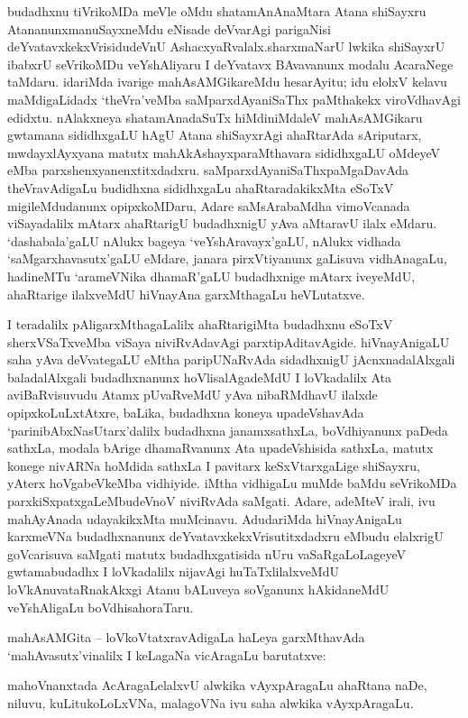 budadhxnu tiVrikoMDa meVle oMdu shatamAnAnaMtara Atana shiSayxru Atananunx\break manuSayxneMdu eNisade deVvarAgi parigaNisi deYvatavxkekxVrisidudeVnU AshacxyaRvalalx.\break sharxmaNarU lwkika shiSayxrU ibabxrU seVrikoMDu veYshAliyaru I deYvatavx BAva\-vanunx modalu AcaraNege taMdaru. idariMda ivarige mahAsAMGikareMdu hesarAyitu; idu elolxV kelavu maMdigaLidadx `theVra'veMba saMparxdAyaniSaThx paMthakekx viroVdha\-vAgi edidxtu. nAlakxneya shatamAnadaSuTx hiMdiniMdaleV mahAsAMGikaru gwtamana sididhx\-gaLU hAgU Atana shiSayxrAgi ahaRtarAda sAriputarx, mwdayxlAyxyana matutx mahA\-kAshayxparaMthavara sididhxgaLU oMdeyeV eMba parxshenxyanenxtitxdadxru. saMparxdAyaniSaThx\break paMgaDavAda theVravAdigaLu budidhxna sididhxgaLu ahaRtaradakikxMta eSoTxV migileMdu\-danunx opipxkoMDaru, Adare saMsArabaMdha vimoVcanada viSayadalilx mAtarx ahaRtarigU budadhxnigU yAva aMtaravU ilalx eMdaru. `dashabala'gaLU nAlukx bageya `veYshAravayx'gaLU, nAlukx vidhada `saMgarxhavasutx'gaLU eMdare, janara pirxVtiyanunx gaLisuva vidhAnagaLu, hadineMTu `arameVNika dhamaR'gaLU budadhxnige mAtarx iveyeMdU, ahaRtarige ilalxveMdU hiVnayAna garxMthagaLu heVLutatxve.

I teradalilx pAligarxMthagaLalilx ahaRtarigiMta budadhxnu eSoTxV sherxVSaTxveMba viSaya niviRvAdavAgi parxtipAditavAgide. hiVnayAnigaLU saha yAva deVvategaLU eMtha paripUNaRvAda sidadhxnigU  jAcnxnadalAlxgali baladalAlxgali budadhxnanunx hoVlisalAgadeMdU I loVkadalilx Ata aviBaRvisuvudu Atamx pUvaRveMdU yAva nibaRMdhavU ilalxde opipxkoLuLxtAtxre, baLika, budadhxna koneya upadeVshavAda `parinibAbxNasUtarx'dalilx budadhxna janamxsathxLa, boVdhiyanunx paDeda sathxLa, modala bArige dhamaRvanunx Ata upadeVshisida sathxLa, matutx konege nivARNa hoMdida sathxLa I pavitarx keSxVtarxgaLige shiSayxru, yAterx hoVgabeVkeMba vidhiyide. iMtha vidhigaLu muMde baMdu seVrikoMDa parxkiSxpatxgaLeMbudeVnoV niviRvAda saMgati. Adare, adeMteV irali, ivu mahAyAnada udayakikxMta muMcinavu. AdudariMda hiVnayAnigaLu karxmeVNa budadhxnanunx deYvatavxkekxVrisutitxdadxru eMbudu elalxrigU goVcarisuva saMgati matutx budadhxgatisida nUru vaSaRgaLoLageyeV gwtamabudadhx I loVkadalilx nijavAgi huTaTxlilalxveMdU loVkAnuvataRnakAkxgi Atanu bALuveya soVganunx hAkidaneMdU veYshAligaLu boVdhisahoraTaru.

mahAsAMGita -- loVkoVtatxravAdigaLa haLeya garxMthavAda `mahAvasutx'vinalilx  I keLagaNa vicAragaLu barutatxve:

mahoVnanxtada AcAragaLelalxvU alwkika vAyxpAragaLu ahaRtana naDe, niluvu, kuLitukoLoLxVNa, malagoVNa ivu saha alwkika vAyxpAragaLu.

